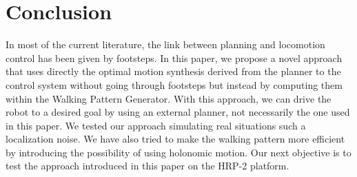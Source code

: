 
\section{Conclusion}
\label{sec:conclusion}

In most of the current literature, the link between planning and locomotion control has been given by footsteps. In this paper, we propose a novel approach that uses directly the optimal motion synthesis derived from the planner to the control system without going through footsteps but instead by computing them within the Walking Pattern Generator. With this approach, we can drive the robot to a desired goal by using an external planner, not necessarily the one used in this paper. We tested our approach simulating real situations such a localization noise. We have also tried to make the walking pattern more efficient by introducing the possibility of using holonomic motion. Our next objective is to test the approach introduced in this paper on the HRP-2 platform.
